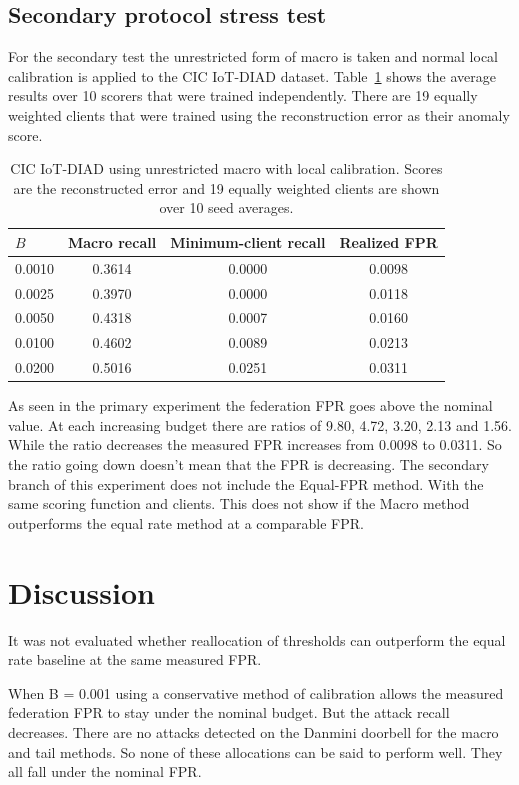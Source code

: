 \documentclass[pdflatex,sn-mathphys-num]{sn-jnl}
\begin{document}
\subsection{Secondary protocol stress test}
For the secondary test the unrestricted form of macro is taken and normal local calibration is applied to the CIC IoT-DIAD dataset. Table~\ref{tab:external} shows the average results over 10 scorers that were trained independently. There are 19 equally weighted clients that were trained using the reconstruction error as their anomaly score.

\begin{table}[!htbp]
\caption{CIC IoT-DIAD using unrestricted macro with local calibration. Scores are the reconstructed error and 19 equally weighted clients are shown over 10 seed averages.}
\label{tab:external}
\centering
\renewcommand{\arraystretch}{1.00}
\begin{tabular*}{0.82\textwidth}{@{\extracolsep{\fill}}lccc@{}}
\toprule
$B$ & Macro recall & Minimum-client recall & Realized FPR\\
\midrule
0.0010 & 0.3614 & 0.0000 & 0.0098\\
0.0025 & 0.3970 & 0.0000 & 0.0118\\
0.0050 & 0.4318 & 0.0007 & 0.0160\\
0.0100 & 0.4602 & 0.0089 & 0.0213\\
0.0200 & 0.5016 & 0.0251 & 0.0311\\
\bottomrule
\end{tabular*}
\end{table}

As seen in the primary experiment the federation FPR goes above the nominal value. At each increasing budget there are ratios of 9.80, 4.72, 3.20, 2.13 and 1.56. While the ratio decreases the measured FPR increases from 0.0098 to 0.0311. So the ratio going down doesn't mean that the FPR is decreasing. The secondary branch of this experiment does not include the Equal-FPR method. With the same scoring function and clients. This does not show if the Macro method outperforms the equal rate method at a comparable FPR.

\FloatBarrier
\section{Discussion}\label{sec:discussion}
It was not evaluated whether reallocation of thresholds can outperform the equal rate baseline at the same measured FPR.

When B = 0.001 using a conservative method of calibration allows the measured federation FPR to stay under the nominal budget. But the attack recall decreases. There are no attacks detected on the Danmini doorbell for the macro and tail methods. So none of these allocations can be said to perform well. They all fall under the nominal FPR.
\end{document}
